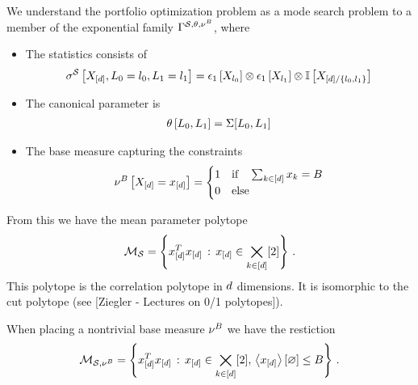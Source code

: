 \documentclass[aps,onecolumn,nofootinbib,pra]{article}
\begin{document}
    We understand the portfolio optimization problem as a mode search problem to a member of the exponential family $\Gamma^{\mathcal{S},\theta,\nu^{B}}$, where
    \begin{itemize}
        \item The statistics consists of
        \begin{align*}
            \sigma^{\mathcal{S}}\left[X_{[d]},L_{0}=l_{0},L_{1}=l_{1}\right]
            = \epsilon_{1}\left[X_{l_{0}}\right] \otimes \epsilon_{1}\left[X_{l_{1}}\right] \otimes \mathbb{I}\left[X_{[d]/\{l_{0},l_{1}\}}\right]
        \end{align*}
        \item The canonical parameter is
        \begin{align*}
            \theta\left[L_{0},L_{1}\right]
            = \Sigma[L_{0},L_{1}]
        \end{align*}
        \item The base measure capturing the constraints
        \begin{align*}
        \nu^{B}\left[X_{[d]}=x_{[d]}\right]
        =\begin{cases}
             1 & \text{if}\quad \sum_{k\in[d]}x_{k} = B \\
             0 & \text{else}
        \end{cases}
    \end{align*}
    \end{itemize}

    From this we have the mean parameter polytope
    \begin{align*}
        \mathcal{M}_{\mathcal{S}} = \left\{ x_{[d]}^Tx_{[d]} \, : \, x_{[d]}\in\bigtimes_{k\in[d]}[2]\right\} \, .
    \end{align*}
    This polytope is the correlation polytope in $d$ dimensions.
    It is isomorphic to the cut polytope (see [Ziegler - Lectures on 0/1 polytopes]).

    When placing a nontrivial base measure $\nu^{B}$ we have the restiction
    \begin{align*}
        \mathcal{M}_{\mathcal{S},\nu^{B}} = \left\{ x_{[d]}^Tx_{[d]} \, : \, x_{[d]}\in\bigtimes_{k\in[d]}[2], \, \left\langle x_{[d]}\right\rangle \left[ \varnothing \right] \leq B\right\} \, .
    \end{align*}
\end{document}
